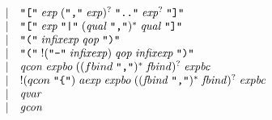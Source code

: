 \begin{align*}
\begin{array}{rcl}
    & \mid & \text{\texttt{\textquotedbl[\textquotedbl}}\; \mathit{exp}\; (\text{\texttt{\textquotedbl,\textquotedbl}}\; \mathit{exp})^?\; \text{\texttt{\textquotedbl..\textquotedbl}}\; \mathit{exp}^?\; \text{\texttt{\textquotedbl]\textquotedbl}} \\
    & \mid & \text{\texttt{\textquotedbl[\textquotedbl}}\; \mathit{exp}\; \text{\texttt{\textquotedbl|\textquotedbl}}\; (\mathit{qual}\; \text{\texttt{\textquotedbl,\textquotedbl}})^*\; \mathit{qual}\; \text{\texttt{\textquotedbl]\textquotedbl}} \\
    & \mid & \text{\texttt{\textquotedbl(\textquotedbl}}\; \mathit{infixexp}\; \mathit{qop}\; \text{\texttt{\textquotedbl)\textquotedbl}} \\
    & \mid & \text{\texttt{\textquotedbl(\textquotedbl}}\; ! (\text{\texttt{\textquotedbl-\textquotedbl}}\; \mathit{infixexp})\; \mathit{qop}\; \mathit{infixexp}\; \text{\texttt{\textquotedbl)\textquotedbl}} \\
    & \mid & \mathit{qcon}\; \mathit{expbo}\; (({fbind}\; \text{\texttt{\textquotedbl,\textquotedbl}})^*\; \mathit{fbind})^?\; \mathit{expbc} \\
    & \mid & !({qcon}\; \text{\texttt{\textquotedbl\{\textquotedbl}})\; \mathit{aexp}\; \mathit{expbo}\; ((\mathit{fbind}\; \text{\texttt{\textquotedbl,\textquotedbl}})^*\; \mathit{fbind})^?\; \mathit{expbc} \\
    & \mid & \mathit{qvar} \\
    & \mid & \mathit{gcon}
  \end{array}
\end{align*}

